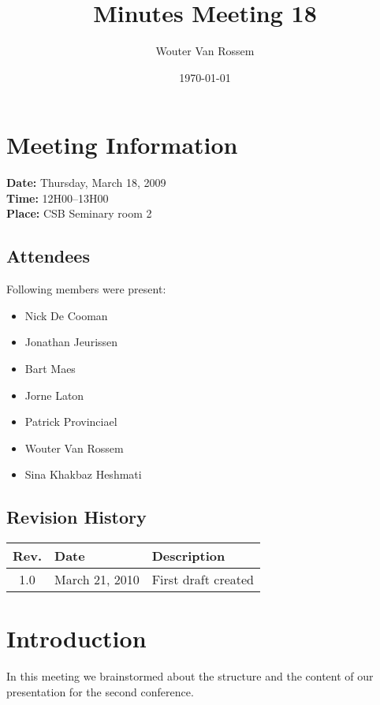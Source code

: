\documentclass[a4paper, 12pt]{article}
\begin{document}
\title{Minutes Meeting 18}
\author{Wouter Van Rossem}
\date{\today}

\maketitle	
	\section{Meeting Information}
		\textbf{Date:} Thursday, March 18, 2009\\
		\textbf{Time:} 12H00--13H00\\
		\textbf{Place:} CSB Seminary room 2\\
		\subsection{Attendees}
Following members were present:
			\begin{itemize}
				\item Nick De Cooman
				\item Jonathan Jeurissen
				\item Bart Maes
				\item Jorne Laton
				\item Patrick Provinciael
				\item Wouter Van Rossem
				\item Sina Khakbaz Heshmati
			\end{itemize}

			 
			
		\subsection{Revision History}
			\begin{tabular}{c | l | l }
				\textbf{Rev.} & \textbf{Date} & \textbf{Description} \\
				\hline
				1.0 & March 21, 2010 & First draft created \\
			\end{tabular}		

	\section{Introduction}
		In this meeting we brainstormed about the structure and the content of our presentation for the second conference. 
		
\end{document}
